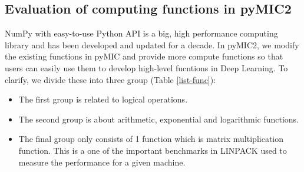 

\subsection{Evaluation of computing functions in pyMIC2}
\label{sec:function_eval}
NumPy with easy-to-use Python API is a big, high performance computing library and has been developed and updated for a decade. In pyMIC2, we modify the existing functions in pyMIC and provide more compute functions so that users can easily use them to develop high-level fucntions in Deep Learning. To clarify, we divide these into three group (Table \ref{list-func}):

\begin{itemize}
	\item The first group is related to logical operations.
	\item The second group is about arithmetic, exponential and logarithmic functions. 
	\item The final group only consists of 1 function which is matrix multiplication function. This is a one of the important benchmarks in LINPACK used to measure the performance for a given machine.
\end{itemize}

